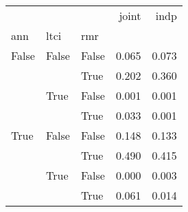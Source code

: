 \begin{tabular}{lllrr}
\toprule
     &      &      &  joint &   indp \\
ann & ltci & rmr &        &        \\
\midrule
False & False & False &  0.065 &  0.073 \\
     &      & True &  0.202 &  0.360 \\
     & True & False &  0.001 &  0.001 \\
     &      & True &  0.033 &  0.001 \\
True & False & False &  0.148 &  0.133 \\
     &      & True &  0.490 &  0.415 \\
     & True & False &  0.000 &  0.003 \\
     &      & True &  0.061 &  0.014 \\
\bottomrule
\end{tabular}
